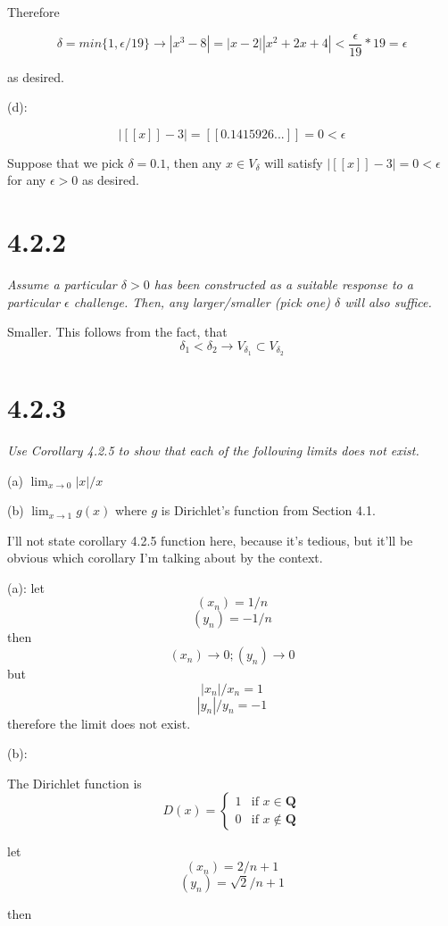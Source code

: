 \documentclass[11pt,oneside,titlepage]{article}
\begin{document}
Therefore

$$\delta = min\{1, \epsilon/19\} \to |x^3 - 8| = |x-2||x^2 + 2x + 4| < \frac{\epsilon}{19} * 19 = \epsilon $$

as desired.

(d):

$$ |[[x]] - 3| = [[0.1415926...]] = 0 < \epsilon $$

Suppose that we pick $\delta = 0.1$, then any $x \in V_{\delta}$ will satisfy $|[[x]] - 3| = 0 < \epsilon $
for any $\epsilon > 0$ as desired.

\section*{4.2.2}
\textit{Assume a particular $\delta > 0$ has been constructed as a suitable response
  to a particular $\epsilon$ challenge. Then, any larger/smaller (pick one) $\delta$ will also suffice.}

Smaller. This follows from the fact, that
$$\delta_1 < \delta_2 \to V_{\delta_1} \subset V_{\delta_2}$$

\section*{4.2.3}
\textit{Use Corollary 4.2.5 to show that each of the following limits does not exist.}

(a) $\lim_{x\to0} |x|/x$

(b) $\lim_{x\to 1} g(x)$ where $g$ is Dirichlet’s function from Section 4.1.

I'll not state corollary 4.2.5  function here, because it's tedious, but it'll be obvious which corollary I'm talking about by the context.


(a): let
$$(x_n) = 1/n$$
$$(y_n) = -1/n$$
then
$$(x_n) \to 0;(y_n) \to 0$$
but
$$|x_n| / x_n = 1$$
$$|y_n| / y_n = -1$$
therefore the limit does not exist.

(b):

The Dirichlet function is
\begin{equation}
D(x)=
    \begin{cases}
        1 & \text{if } x \in \textbf{Q}\\
        0 & \text{if } x \notin \textbf{Q}
    \end{cases}
\end{equation}

let
$$(x_n) = 2/n + 1$$
$$(y_n) = \sqrt{2}/n + 1$$

then
\end{document}
